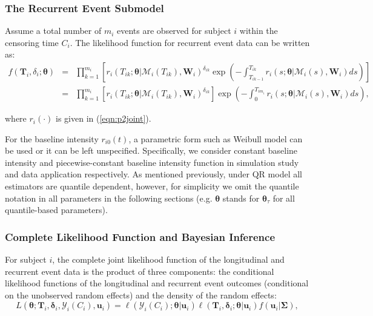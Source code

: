 \subsubsection{The Recurrent Event Submodel}\label{sec:p2surv_submodel}
Assume a total number of $m_i$ events are observed for subject $i$ within the censoring time $C_i$. The likelihood function for recurrent event data can be written as:
\begin{eqnarray}\label{eqn:p2lik_sur}
f({\boldsymbol T}_i, \delta_i;\boldsymbol{\theta})&=& \nonumber \prod_{k=1}^{m_i}\left[r_i(T_{ik};\boldsymbol{\theta}|\mathcal{M}_{i}(T_{ik}), \boldsymbol{W}_i)^{\delta_{ik}}\exp\left(-\int_{T_{ik-1}}^{T_{ik}}r_i(s;\boldsymbol{\theta}|\mathcal{M}_{i}(s), \boldsymbol{W}_i)ds\right)\right]\\
&=& \prod_{k=1}^{m_i}\left[r_i(T_{ik};\boldsymbol{\theta}|\mathcal{M}_{i}(T_{ik}), \boldsymbol{W}_i)^{\delta_{ik}}\right]\exp\left(-\int_0^{T_{im_i}}r_i(s;\boldsymbol{\theta}|\mathcal{M}_{i}(s), \boldsymbol{W}_i)ds\right),
\end{eqnarray}

\noindent where $r_i(\cdot)$ is given in (\ref{eqn:p2joint}).

For the baseline intensity $r_{i0}(t)$, a parametric form such as Weibull model can be used or it can be left unspecified. Specifically, we consider constant baseline intensity and piecewise-constant baseline intensity function in simulation study and data application respectively. As mentioned previously, under QR model all estimators are quantile dependent, however, for simplicity we omit the quantile notation in all parameters in the following sections (e.g. $\boldsymbol{\theta}$ stands for $\boldsymbol{\theta}_{\tau}$ for all quantile-based parameters).


\subsubsection{Complete Likelihood Function and Bayesian Inference}\label{sec:p2estimation}
For subject $i$, the complete joint likelihood function of the longitudinal and recurrent event data is the product of three components: the conditional likelihood functions of the longitudinal and recurrent event outcomes (conditional on the unobserved random effects) and the density of the random effects:
\begin{equation}\label{eqn:p2full_lik}
L(\boldsymbol{\theta};{\boldsymbol T}_i, \boldsymbol{\delta}_i, \mathcal{Y}_{i}(C_i), \boldsymbol{u}_i) = \ell(\mathcal{Y}_{i}(C_i); \boldsymbol{\theta}|\boldsymbol{u}_i)\ell({\boldsymbol T}_i, {\boldsymbol\delta}_i; \boldsymbol{\theta}|\boldsymbol{u}_i)f(\boldsymbol{u}_i|\boldsymbol{\Sigma}),
\end{equation}

